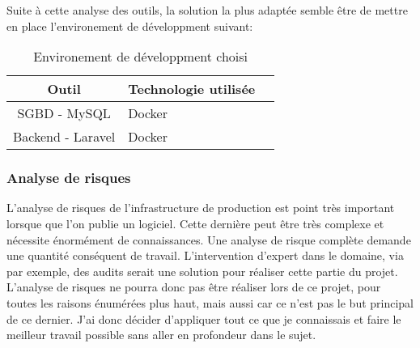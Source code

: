 \documentclass[
    iai, %
    il, %
]{heig-tb}
\begin{document}



Suite à cette analyse des outils, la solution la plus adaptée semble être de mettre en place l'environement de développment suivant:

\begin{table}[h]
    \begin{center}
        \caption{Environement de développment choisi \label{env_prod}}
        \begin{tabular}{c|l|r}
            Outil             & Technologie utilisée \\ \hline
            SGBD - MySQL      & Docker               \\
            Backend - Laravel & Docker               \\
        \end{tabular}
    \end{center}
\end{table}

\subsubsection{Analyse de risques}

L'analyse de risques de l'infrastructure de production est point très important lorsque que l'on publie un logiciel. Cette dernière peut être très complexe et nécessite énormément de connaissances.
Une analyse de risque complète demande une quantité conséquent de travail. L'intervention d'expert dans le domaine, via par exemple, des audits serait une solution pour réaliser cette partie du projet. \newline
L'analyse de risques ne pourra donc pas être réaliser lors de ce projet, pour toutes les raisons énumérées plus haut, mais aussi car ce n'est pas le but principal de ce dernier.
J'ai donc décider d'appliquer tout ce que je connaissais et faire le meilleur travail possible sans aller en profondeur dans le sujet.

\end{document}
